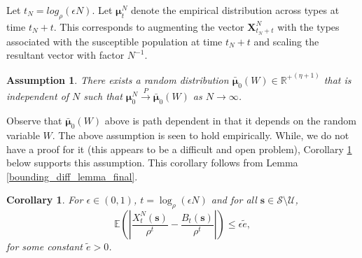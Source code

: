 \documentclass{article}
\newtheorem{assumption}{Assumption}
\newtheorem{corollary}{Corollary}[section]
\theoremstyle{definition}
\newcommand{\Real}{\mathbb{R}}
\newcommand{\lrp}[1]{\left({#1}\right)}
\newcommand{\Exp}[1]{\mathbb{E}\lrp{#1}}
\begin{document}
Let $t_N= log_{\rho} (\epsilon N)$. Let $\bm{\mu}^N_{t}$ denote the empirical distribution across types at time $t_N+t$. This corresponds
to augmenting the vector $\bm{X}_{t_N+t}^N$  with the types associated with the susceptible population at time $t_N+t$
and scaling the resultant vector with factor $N^{-1}$.



\begin{assumption} 
There  exists  a random distribution  $\bm{\bar{\mu}}_{0}(W) \in {\Real^+}^{(\eta+1)}$ that is independent of $N$ 
such that  $\bm{\mu}^N_{0} \xrightarrow{P} \bm{\bar{\mu}}_{0}(W)$ as $N \rightarrow \infty$.
\label{deterministic assumption}
\end{assumption}


Observe that $\bm{\bar{\mu}}_{0}(W)$ above is path dependent in that  it depends on  the random variable $W$. 
The above assumption is seen to hold empirically. While, we do not have a proof for it (this appears to be a difficult and open problem),  Corollary \ref{e_b_close_epsilon} below
supports this assumption. This corollary follows from Lemma \ref{bounding_diff_lemma_final}.


\begin{corollary} For $\epsilon \in (0,1)$, $t=\log_\rho(\epsilon N)$ and for all $\bm{s}\in \mathcal S \setminus  \mathcal U$,
        \begin{equation*}
        \Exp{ \left\lvert{\frac{{X}_t^N(\bm{s})}{\rho^t} - \frac{{B}_t(\bm{s})}{\rho^t}}\right\rvert } \leq \epsilon \tilde{e},
        \end{equation*}
        for some constant $\tilde{e}>0$.
     \label{e_b_close_epsilon}   
\end{corollary}




\end{document}
